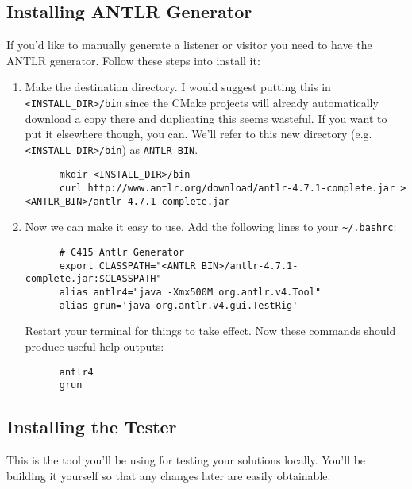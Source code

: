\documentclass[../setup.tex]{subfiles}
\begin{document}
\subsection{Installing ANTLR Generator}
If you'd like to manually generate a listener or visitor you need to have the ANTLR generator.
Follow these steps into install it:
\begin{enumerate}
  \item
    Make the destination directory. I would suggest putting this in \lstinline{<INSTALL_DIR>/bin}
    since the CMake projects will already automatically download a copy there and duplicating
    this seems wasteful. If you want to put it elsewhere though, you can. We'll refer to this new
    directory (e.g. \lstinline{<INSTALL_DIR>/bin}) as \lstinline{ANTLR_BIN}.
    \begin{lstlisting}
      mkdir <INSTALL_DIR>/bin
      curl http://www.antlr.org/download/antlr-4.7.1-complete.jar > <ANTLR_BIN>/antlr-4.7.1-complete.jar
    \end{lstlisting}
  \item
    Now we can make it easy to use. Add the following lines to your \lstinline{~/.bashrc}:
    \begin{lstlisting}
      # C415 Antlr Generator
      export CLASSPATH="<ANTLR_BIN>/antlr-4.7.1-complete.jar:$CLASSPATH"
      alias antlr4="java -Xmx500M org.antlr.v4.Tool"
      alias grun='java org.antlr.v4.gui.TestRig'
    \end{lstlisting}
    Restart your terminal for things to take effect. Now these commands should produce useful help
    outputs:
    \begin{lstlisting}
      antlr4
      grun
    \end{lstlisting}
\end{enumerate}

\subsection{Installing the Tester}
This is the tool you'll be using for testing your solutions locally. You'll be building it yourself
so that any changes later are easily obtainable.
\end{document}

